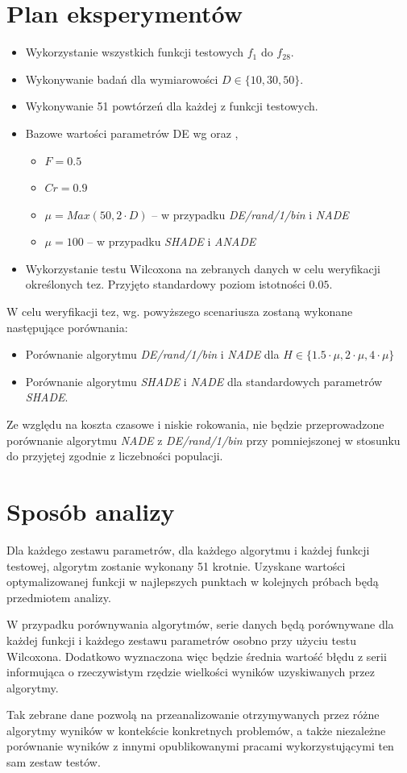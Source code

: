 \documentclass[12pt,a4paper]{report}
\begin{document}
{{{{{{\section{Plan eksperymentów}
\par{
\begin{itemize}
\item Wykorzystanie wszystkich funkcji testowych $f_1$ do $f_{28}$.
\item Wykonywanie badań dla wymiarowości $D \in \{10, 30, 50\}$.
\item Wykonywanie 51 powtórzeń dla każdej z funkcji testowych.
\item Bazowe wartości parametrów DE wg \cite{CEC2013DEbasic} oraz \cite{SHADE},
\begin{itemize}
\item $F = 0.5$
\item $Cr = 0.9$
\item $\mu = Max(50, 2 \cdot D)$ -- w przypadku \emph{DE/rand/1/bin} i \emph{NADE}
\item $\mu = 100$ -- w przypadku \emph{SHADE} i \emph{ANADE}
\end{itemize}
\item Wykorzystanie testu Wilcoxona na zebranych danych w celu weryfikacji określonych tez. Przyjęto standardowy poziom istotności $0.05$.
\end{itemize}
}
\par{
W celu weryfikacji tez, wg. powyższego scenariusza zostaną wykonane następujące porównania:
\begin{itemize}
\item Porównanie algorytmu \emph{DE/rand/1/bin} i \emph{NADE} dla $H \in \{1.5 \cdot \mu, 2 \cdot \mu, 4 \cdot \mu \}$
\item Porównanie algorytmu \emph{SHADE} i \emph{NADE} dla standardowych parametrów \emph{SHADE}.
\end{itemize}
}
\par{
Ze względu na koszta czasowe i niskie rokowania, nie będzie przeprowadzone porównanie algorytmu \emph{NADE} z \emph{DE/rand/1/bin} przy pomniejszonej w stosunku do przyjętej zgodnie z \cite{CEC2013DEbasic} liczebności populacji.
}

\section{Sposób analizy}
\par{
Dla każdego zestawu parametrów, dla każdego algorytmu i każdej funkcji testowej, algorytm zostanie wykonany 51 krotnie. Uzyskane wartości optymalizowanej funkcji w najlepszych punktach w kolejnych próbach będą przedmiotem analizy.
}
\par{
W przypadku porównywania algorytmów, serie danych będą porównywane dla każdej funkcji i każdego zestawu parametrów osobno przy użyciu testu Wilcoxona. Dodatkowo wyznaczona więc będzie średnia wartość błędu z serii informująca o rzeczywistym rzędzie wielkości wyników uzyskiwanych przez algorytmy.
}
\par{
Tak zebrane dane pozwolą na przeanalizowanie otrzymywanych przez różne algorytmy wyników w kontekście konkretnych problemów, a także niezależne porównanie wyników z innymi opublikowanymi pracami wykorzystującymi ten sam zestaw testów.
}
}}}}}}
\end{document}

